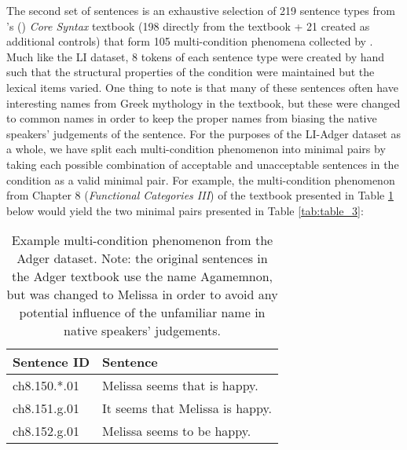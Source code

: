 The second set of sentences is an exhaustive selection of 219 sentence types from \citeauthor{adger2003core}'s (\citeyear{adger2003core}) \textit{Core Syntax} textbook (198 directly from the textbook + 21 created as additional controls) that form 105 multi-condition phenomena collected by \citet{sprouse2012assessing}.  Much like the LI dataset, 8 tokens of each sentence type were created by hand such that the structural properties of the condition were maintained but the lexical items varied.  One thing to note is that many of these sentences often have interesting names from Greek mythology in the textbook, but these were changed to common names in order to keep the proper names from biasing the native speakers' judgements of the sentence.  For the purposes of the LI-Adger dataset as a whole, we have split each multi-condition phenomenon into minimal pairs by taking each possible combination of acceptable and unacceptable sentences in the condition as a valid minimal pair.  For example, the multi-condition phenomenon from Chapter 8 (\textit{Functional Categories III}) of the textbook presented in Table \ref{tab:table_2} below would yield the two minimal pairs presented in Table \ref{tab:table_3}:
\begin{table}[h]
    \centering
    \begin{tabular}{ll}
    \toprule
    \textbf{Sentence ID} & \textbf{Sentence}  \\
    \midrule
    ch8.150.*.01 & Melissa seems that is happy. \\
    ch8.151.g.01 & It seems that Melissa is happy. \\
    ch8.152.g.01 & Melissa seems to be happy. \\
    \bottomrule
    \end{tabular}
    \caption[Example multi-condition phenomenon from the Adger dataset.]{Example multi-condition phenomenon from the Adger dataset.  Note: the original sentences in the Adger textbook use the name Agamemnon, but was changed to Melissa in order to avoid any potential influence of the unfamiliar name in native speakers' judgements.}
    \label{tab:table_2}
\end{table}

